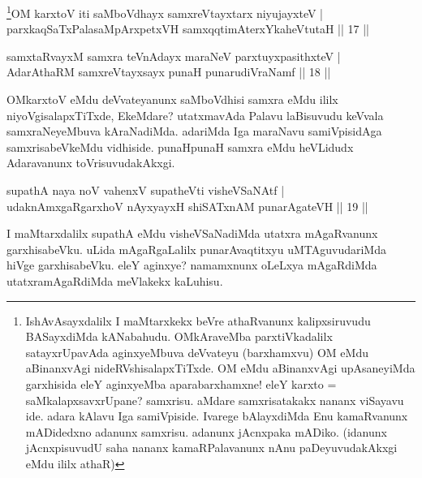 \begin{shl}
\footnote{IshAvAsayxdalilx I maMtarxkekx beVre athaRvanunx 
kalipxsiruvudu BASayxdiMda kANabahudu. OMkAraveMba parxtiVkadalilx 
satayxrUpavAda aginxyeMbuva deVvateyu (barxhamxvu) OM eMdu aBinanxvAgi 
nideRVshisalapxTiTxde. OM eMdu aBinanxvAgi upAsaneyiMda garxhisida 
eleY aginxyeMba aparabarxhamxne! eleY karxto = saMkalapxsavxrUpane? 
samxrisu. aMdare samxrisatakakx nananx viSayavu ide. adara kAlavu Iga 
samiVpiside. Ivarege bAlayxdiMda Enu kamaRvanunx mADidedxno adanunx 
samxrisu. adanunx jAcnxpaka mADiko. (idanunx jAcnxpisuvudU saha nananx 
kamaRPalavanunx nAnu paDeyuvudakAkxgi eMdu ililx athaR)}OM karxtoV iti saMboVdhayx samxreVtayxtarx niyujayxteV | \\
parxkaqSaTxPalasaMpArxpetxVH samxqqtimAterxYkaheVtutaH \hfill||  17 || 
\end{shl}

\begin{shl}
samxtaRvayxM samxra teVnAdayx maraNeV parxtuyxpasithxteV | \\
AdarAthaRM samxreVtayxsayx punaH punarudiVraNamf \hfill||  18 || 
\end{shl}

\begin{artha} 
OMkarxtoV eMdu deVvateyanunx saMboVdhisi samxra eMdu ililx 
niyoVgisalapxTiTxde, EkeMdare? utatxmavAda Palavu laBisuvudu keVvala 
samxraNeyeMbuva kAraNadiMda. adariMda Iga maraNavu samiVpisidAga 
samxrisabeVkeMdu vidhiside. punaHpunaH samxra eMdu heVLidudx 
Adaravanunx toVrisuvudakAkxgi.
\end{artha}


\begin{shl}
supathA naya noV vahenxV supatheVti visheVSaNAtf | \\
udaknAmxgaRgarxhoV nAyxyayxH shiSATxnAM punarAgateVH \hfill||  19 || 
\end{shl}

\begin{artha} 
I maMtarxdalilx supathA eMdu visheVSaNadiMda utatxra mAgaRvanunx 
garxhisabeVku. uLida mAgaRgaLalilx punarAvaqtitxyu uMTAguvudariMda 
hiVge garxhisabeVku. eleY aginxye? namamxnunx oLeLxya mAgaRdiMda 
utatxramAgaRdiMda meVlakekx kaLuhisu.
\end{artha}


